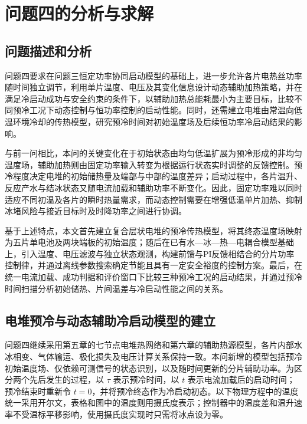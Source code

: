 \documentclass[bwprint]{gmcmthesis}
\numberwithin{figure}{section}
\begin{document}
\setcounter{section}{6}
\setcounter{table}{8}
\section{问题四的分析与求解}

\subsection{问题描述和分析}

问题四要求在问题三恒定功率协同启动模型的基础上，进一步允许各片电热丝功率随时间独立调节，利用单片温度、电压及其变化信息设计动态辅助加热策略，并在满足冷启动成功与安全约束的条件下，以辅助加热总能耗最小为主要目标，比较不同预冷工况下动态控制与恒功率控制的启动性能。同时，还需建立电堆由常温向低温环境冷却的传热模型，研究预冷时间对初始温度场及后续恒功率冷启动结果的影响。

与前一问相比，本问的关键变化在于初始状态由均匀低温扩展为预冷形成的非均匀温度场，辅助加热则由固定功率输入转变为根据运行状态实时调整的反馈控制。预冷程度决定电堆的初始储热量及端部与中部的温度差异；启动过程中，各片温升、反应产水与结冰状态又随电流加载和辅助功率不断变化。因此，固定功率难以同时适应不同初温及各片的瞬时热量需求，而动态控制需要在增强低温单片加热、抑制冰堵风险与接近目标时及时降功率之间进行协调。

基于上述特点，本文首先建立复合层状电堆的预冷传热模型，将其终态温度场映射为五片单电池及两块端板的初始温度；随后在已有水—冰—热—电耦合模型基础上，引入温度、电压滤波与独立状态观测，构建前馈与PI反馈相结合的分片功率控制律，并通过离线参数搜索确定节能且具有一定安全裕度的控制方案。最后，在统一电流加载、成功判据和评价窗口下比较三种预冷工况的启动结果，并通过预冷时间扫描分析初始储热、片间温差与冷启动性能之间的关系。

\subsection{电堆预冷与动态辅助冷启动模型的建立}

问题四继续采用第五章的七节点电堆热网络和第六章的辅助热源模型，各片内部水冰相变、气体输运、极化损失及电压计算关系保持一致。本问新增的模型包括预冷初始温度场、仅依赖可测信号的状态识别，以及随时间更新的分片辅助功率。为区分两个先后发生的过程，以 $\tau$ 表示预冷时间，以 $t$ 表示电流加载后的启动时间；预冷结束时重新令 $t=0$，并将预冷终态作为冷启动初态。以下物理方程中的温度统一采用开尔文，表格和图中的温度则用摄氏度表示；控制器中的温度差和温升速率不受温标平移影响，使用摄氏度实现时只需将冰点设为零。
\end{document}
